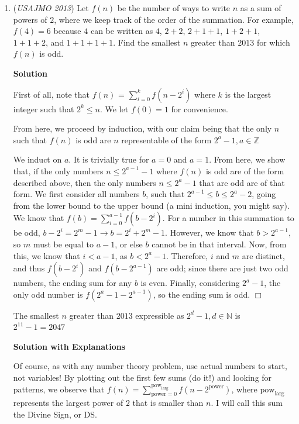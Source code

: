 \begin{enumerate}
 \textit{Solution by SimilarTriangle.}

 


	\item (\textit{USAJMO 2013}) Let $f(n)$ be the number of ways to write $n$ as a sum of powers of $2$, where we keep track of the order of the summation.  For example, $f(4)=6$ because $4$ can be written as $4$, $2+2$, $2+1+1$, $1+2+1$, $1+1+2$, and $1+1+1+1$.  Find the smallest $n$ greater than $2013$ for which $f(n)$ is odd.


 



\textbf{Solution}

First of all, note that $f(n)$ = $\sum_{i=0}^{k} f(n-2^{i})$ where $k$ is the largest integer such that $2^k \le n$.  We let $f(0) = 1$ for convenience.  

 From here, we proceed by induction, with our claim being that the only $n$ such that $f(n)$ is odd are $n$ representable of the form $2^{a} - 1, a \in \mathbb{Z}$

 We induct on $a$.  It is trivially true for $a = 0$ and $a = 1$.  From here, we show that, if the only numbers $n \le 2^{a-1} - 1$ where $f(n)$ is odd are of the form described above, then the only numbers $n \le 2^{a} -1$ that are odd are of that form.  We first consider all numbers $b$, such that $2^{a-1} \le b \le 2^{a} - 2$, going from the lower bound to the upper bound (a mini induction, you might say).  We know that $f(b) = \sum_{i=0}^{a-1} f(b-2^{i})$.  For a number in this summation to be odd, $b - 2^i = 2^m -1 \rightarrow b = 2^i + 2^m - 1$.  However, we know that $b > 2^{a-1}$, so $m$ must be equal to $a-1$, or else $b$ cannot be in that interval.  Now, from this, we know that $i < a-1$, as $b<2^{a} - 1$.  Therefore, $i$ and $m$ are distinct, and thus $f(b - 2^i)$ and $f(b- 2^{a-1})$ are odd; since there are just two odd numbers, the ending sum for any $b$ is even.  Finally, considering $2^{a} - 1$, the only odd number is $f(2^{a} - 1 - 2^{a-1})$, so the ending sum is odd.  $\Box$

 The smallest $n$ greater than $2013$ expressible as $2^d - 1, d \in \mathbb{N}$ is $2^{11} -1 = \boxed{2047}$




\textbf{Solution with Explanations}

Of course, as with any number theory problem, use actual numbers to start, not variables! By plotting out the first few sums (do it!) and looking for patterns, we observe that $f(n)=\sum_{\textrm{power}=0}^{\textrm{pow}_{\textrm{larg}}} f(n-2^{\textrm{power}})$, where $\textrm{pow}_{\textrm{larg}}$ represents the largest power of $2$ that is smaller than $n$. I will call this sum the Divine Sign, or DS.


\end{enumerate}
